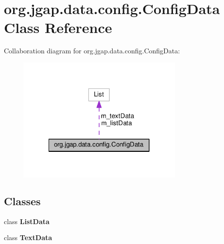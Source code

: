 \hypertarget{classorg_1_1jgap_1_1data_1_1config_1_1_config_data}{\section{org.\-jgap.\-data.\-config.\-Config\-Data Class Reference}
\label{classorg_1_1jgap_1_1data_1_1config_1_1_config_data}
}


Collaboration diagram for org.\-jgap.\-data.\-config.\-Config\-Data\-:
\nopagebreak
\begin{figure}[H]
\begin{center}
\leavevmode
\includegraphics[width=234pt]{classorg_1_1jgap_1_1data_1_1config_1_1_config_data__coll__graph}
\end{center}
\end{figure}
\subsection*{Classes}
\begin{DoxyCompactItemize}
\item 
class {\bfseries List\-Data}
\item 
class {\bfseries Text\-Data}
\end{DoxyCompactItemize}
